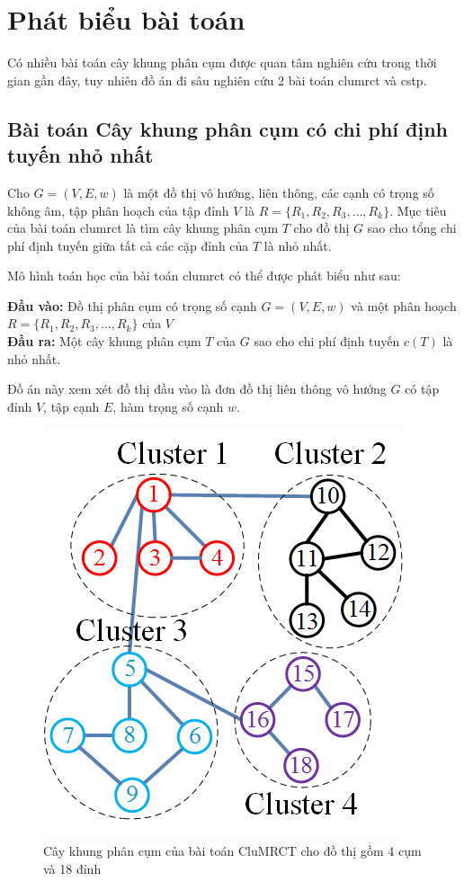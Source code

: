 \section{Phát biểu bài toán} \label{chap_coso:sec:phatbieubaitoan}
Có nhiều bài toán cây khung phân cụm được quan tâm nghiên cứu trong thời gian gần đây, tuy nhiên đồ án đi sâu nghiên cứu 2 bài toán \gls{clumrct} và \gls{cstp}.

\subsection{Bài toán Cây khung phân cụm có chi phí định tuyến nhỏ nhất} \label{chap_coso:sec_mfea:subsec:clumrct}
Cho $G = (V, E, w)$ là một đồ thị vô hướng, liên thông, các cạnh có trọng số không âm, tập phân hoạch của tập đỉnh $V$ là $R = \{R_1, R_2, R_3,\ldots,R_k\}$. Mục tiêu của bài toán \gls{clumrct} là tìm cây khung phân cụm $T$ cho đồ thị $G$ sao cho tổng chi phí định tuyến giữa tất cả các cặp đỉnh của $T$ là nhỏ nhất.

Mô hình toán học của bài toán \gls{clumrct} có thể được phát biểu như sau:

\noindent\textbf{Đầu vào:} Đồ thị phân cụm có trọng số cạnh $G = (V, E, w)$ và một phân hoạch $R = \{R_1, R_2, R_3,\ldots,R_k\}$ của $V$\\
\textbf{Đầu ra:} Một cây khung phân cụm $T$ của $G$ sao cho chi phí định tuyến $c(T)$ là nhỏ nhất. 


Đồ án này xem xét đồ thị đầu vào là đơn đồ thị liên thông vô hướng $G$ có tập đỉnh $V$, tập cạnh $E$, hàm trọng số cạnh $w$.

\renewcommand{\scalefigure}{0.6}
\begin{figure}[htbp]
	\centering		
	\includegraphics[scale=\scalefigure]{Pictures/CluMRCT/CluMRCT.png}
	\centering
	\caption{Cây khung phân cụm của bài toán CluMRCT cho đồ thị gồm 4 cụm và 18 đỉnh}
	\label{fig:vi_du_CluMRC}
\end{figure}

